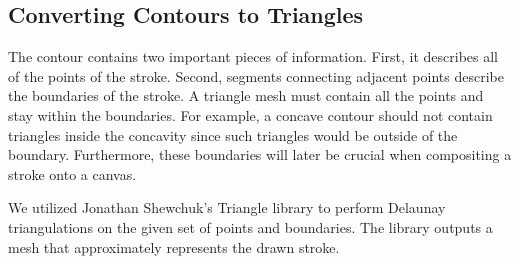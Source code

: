 \documentclass[conference]{acmsiggraph}
\begin{document}


\subsection{Converting Contours to Triangles}
The contour contains two important pieces of information. First, it describes all of the points of the stroke.
Second, segments connecting adjacent points describe the boundaries of the stroke. 
A triangle mesh must contain all the points and stay
within the boundaries. For example, a concave contour should not contain triangles inside the concavity since such triangles
would be outside of the boundary.
Furthermore, these boundaries will later be crucial when compositing a stroke onto a canvas.

We utilized Jonathan Shewchuk's Triangle library to perform Delaunay triangulations
on the given set of points and boundaries. The library outputs a mesh that
approximately represents the drawn stroke.
\end{document}
